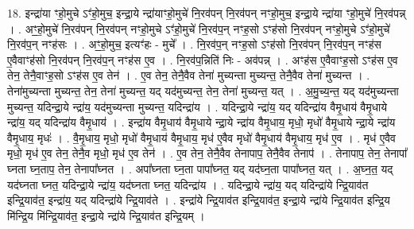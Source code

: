 \documentclass[17pt]{extarticle}
\begin{document}
18. इन्द्रा॑या ꣳहो॒मुचे ऽꣳ॑हो॒मुच॒ इन्द्रा॒ये न्द्रा॑याꣳहो॒मुचे॑ नि॒रव॑पन् नि॒रव॑पन् नꣳहो॒मुच॒ इन्द्रा॒ये न्द्रा॑या ꣳहो॒मुचे॑ नि॒रव॑पन्न् । . अꣳ॒॒हो॒मुचे॑ नि॒रव॑पन् नि॒रव॑पन् नꣳहो॒मुचे ऽꣳ॑हो॒मुचे॑ नि॒रव॑प॒न् नꣳह॒सो ऽꣳह॑सो नि॒रव॑पन् नꣳहो॒मुचे ऽꣳ॑हो॒मुचे॑ नि॒रव॑प॒न् नꣳह॑सः । . अꣳ॒॒हो॒मुच॒ इत्यꣳ॑हः - मुचे᳚ । . नि॒रव॑प॒न् नꣳह॒सो ऽꣳह॑सो नि॒रव॑पन् नि॒रव॑प॒न् नꣳह॑स ए॒वैवाꣳह॑सो नि॒रव॑पन् नि॒रव॑प॒न् नꣳह॑स ए॒व । . नि॒रव॑प॒न्निति॑ निः - अव॑पन्न् । . अꣳह॑स ए॒वैवाꣳह॒सो ऽꣳह॑स ए॒व तेन॒ तेनै॒वाꣳह॒सो ऽꣳह॑स ए॒व तेन॑ । . ए॒व तेन॒ तेनै॒वैव तेना॑ मुच्यन्ता मुच्यन्त॒ तेनै॒वैव तेना॑ मुच्यन्त । . तेना॑मुच्यन्ता मुच्यन्त॒ तेन॒ तेना॑ मुच्यन्त॒ यद् यद॑मुच्यन्त॒ तेन॒ तेना॑ मुच्यन्त॒ यत् । . अ॒मु॒च्य॒न्त॒ यद् यद॑मुच्यन्ता मुच्यन्त॒ यदिन्द्रा॒ये न्द्रा॑य॒ यद॑मुच्यन्ता मुच्यन्त॒ यदिन्द्रा॑य । . यदिन्द्रा॒ये न्द्रा॑य॒ यद् यदिन्द्रा॑य वैमृ॒धाय॑ वैमृ॒धाये न्द्रा॑य॒ यद् यदिन्द्रा॑य वैमृ॒धाय॑ । . इन्द्रा॑य वैमृ॒धाय॑ वैमृ॒धाये न्द्रा॒ये न्द्रा॑य वैमृ॒धाय॒ मृधो॒ मृधो॑ वैमृ॒धाये न्द्रा॒ये न्द्रा॑य वैमृ॒धाय॒ मृधः॑ । . वै॒मृ॒धाय॒ मृधो॒ मृधो॑ वैमृ॒धाय॑ वैमृ॒धाय॒ मृध॑ ए॒वैव मृधो॑ वैमृ॒धाय॑ वैमृ॒धाय॒ मृध॑ ए॒व । . मृध॑ ए॒वैव मृधो॒ मृध॑ ए॒व तेन॒ तेनै॒व मृधो॒ मृध॑ ए॒व तेन॑ । . ए॒व तेन॒ तेनै॒वैव तेनापाप॒ तेनै॒वैव तेनाप॑ । . तेनापाप॒ तेन॒ तेनापा᳚ घ्नता घ्न॒ताप॒ तेन॒ तेनापा᳚घ्नत । . अपा᳚घ्नता घ्न॒ता पापा᳚घ्नत॒ यद् यद॑घ्न॒ता पापा᳚घ्नत॒ यत् । . अ॒घ्न॒त॒ यद् यद॑घ्नता घ्नत॒ यदिन्द्रा॒ये न्द्रा॑य॒ यद॑घ्नता घ्नत॒ यदिन्द्रा॑य । . यदिन्द्रा॒ये न्द्रा॑य॒ यद् यदिन्द्रा॑ये न्द्रि॒याव॑त इन्द्रि॒याव॑त॒ इन्द्रा॑य॒ यद् यदिन्द्रा॑ये न्द्रि॒याव॑ते । . इन्द्रा॑ये न्द्रि॒याव॑त इन्द्रि॒याव॑त॒ इन्द्रा॒ये न्द्रा॑ये न्द्रि॒याव॑त इन्द्रि॒य मि॑न्द्रि॒य मि॑न्द्रि॒याव॑त॒ इन्द्रा॒ये न्द्रा॑ये न्द्रि॒याव॑त इन्द्रि॒यम् । \newline
\end{document}
